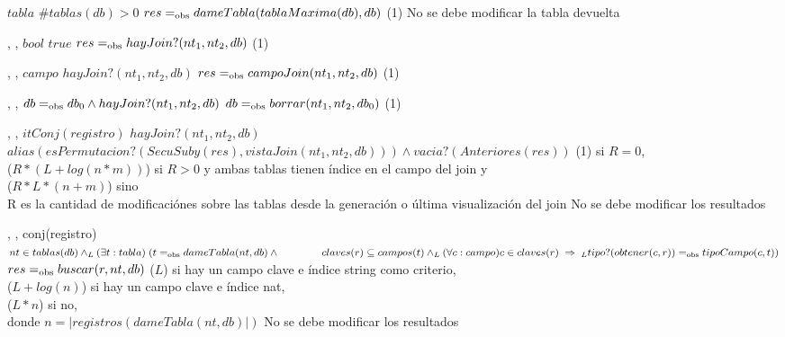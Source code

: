 {   }
{$tabla$}
{$\#tablas(db) > 0$}
{$res =_{\mathrm{obs}} dameTabla(tablaMaxima(db),db)$}
{\bigo(1)}
{No se debe modificar la tabla devuelta}
{}

{   ,
    ,
    }
{$bool$}
{$true$}
{$res =_{\mathrm{obs}} hayJoin?(nt_1,nt_2,db)$}
{\bigo(1)}
{}
{}

{   ,
    ,
    }
{$campo$}
{$hayJoin?(nt_1,nt_2,db)$}
{$res =_{\mathrm{obs}} campoJoin(nt_1,nt_2,db)$}
{\bigo(1)}
{}
{}

{   ,
    ,
    }
{}
{$db =_{\mathrm{obs}} db_0 \land hayJoin?(nt_1,nt_2,db)$}
{$db =_{\mathrm{obs}} borrar(nt_1,nt_2,db_0)$}
{\bigo(1)}
{}
{}

{   ,
    ,
    }
{$itConj(registro)$}
{$hayJoin?(nt_1,nt_2,db)$}
{$alias(esPermutacion?(SecuSuby(res), vistaJoin(nt_1, nt_2, db))) \land vacia?(Anteriores(res))$}
{\bigo(1) si $R = 0$, \\
    \hspace*{4em} \bigo($R * (L + log(n * m))$) si $R > 0$ y ambas tablas tienen índice en el campo del join y \\
    \hspace*{4em} \bigo($R * L * (n + m)$) sino \\
    \hspace*{4em} R es la cantidad de modificaciónes sobre las tablas desde la generación o última visualización del join}
{No se debe modificar los resultados}
{}

{   ,
    ,
    }
{conj(registro)}
{$nt \in tablas(db) \land_L (\exists t : tabla) \; (t \igobs dameTabla(nt,db) \land \\
    \hspace*{4em} claves(r) \subseteq campos(t) \land_L
        (\forall c : campo) c \in claves(r) \implies_L tipo?(obtener(c,r)) \igobs tipoCampo(c,t))$}
{$res =_{\mathrm{obs}} buscar(r,nt,db)$}
{\bigo($L$) si hay un campo clave e índice string como criterio, \\
    \hspace*{4em} \bigo($L + log(n)$) si hay un campo clave e índice nat, \\
    \hspace*{4em} \bigo($L * n$) si no, \\
    \hspace*{4em} donde $n = |registros(dameTabla(nt,db)|)$}
{No se debe modificar los resultados}
{}

